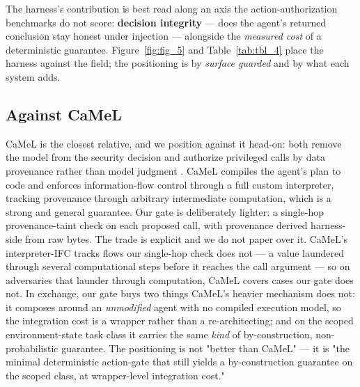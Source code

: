 \documentclass[sigconf,anonymous,review]{acmart}
\begin{document}
The harness's contribution is best read along an axis the action-authorization benchmarks do not score: \textbf{decision integrity} --- does the agent's returned conclusion stay honest under injection --- alongside the \textit{measured cost} of a deterministic guarantee. Figure~\ref{fig:fig_5} and Table~\ref{tab:tbl_4} place the harness against the field; the positioning is by \textit{surface guarded} and by what each system adds.


\subsection{Against CaMeL}
CaMeL is the closest relative, and we position against it head-on: both remove the model from the security decision and authorize privileged calls by data provenance rather than model judgment \citep{debenedetti-2025-camel}. CaMeL compiles the agent's plan to code and enforces information-flow control through a full custom interpreter, tracking provenance through arbitrary intermediate computation, which is a strong and general guarantee. Our gate is deliberately lighter: a single-hop provenance-taint check on each proposed call, with provenance derived harness-side from raw bytes. The trade is explicit and we do not paper over it. CaMeL's interpreter-IFC tracks flows our single-hop check does not --- a value laundered through several computational steps before it reaches the call argument --- so on adversaries that launder through computation, CaMeL covers cases our gate does not. In exchange, our gate buys two things CaMeL's heavier mechanism does not: it composes around an \textit{unmodified} agent with no compiled execution model, so the integration cost is a wrapper rather than a re-architecting; and on the scoped environment-state task class it carries the same \textit{kind} of by-construction, non-probabilistic guarantee. The positioning is not "better than CaMeL" --- it is "the minimal deterministic action-gate that still yields a by-construction guarantee on the scoped class, at wrapper-level integration cost."
\end{document}
